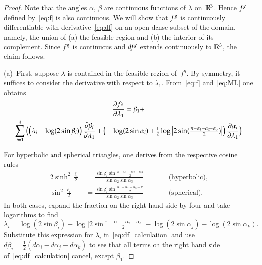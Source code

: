 \documentclass[Thesis]{subfiles}
\begin{document}
\begin{proof}
  Note that the angles $\alpha$, $\beta$ are continuous functions of
  $\lambda$ on~$\mathbb R^{3}$. Hence $f^{g}$ defined by~\eqref{eq:f} is
  also continuous. We will show that $f^{g}$ is continuously
  differentiable with derivative~\eqref{eq:df} on an open dense subset
  of the domain, namely, the union of (a) the feasible region and (b)
  the interior of its complement. Since $f^{g}$ is continuous and
  $\it df^{g}$ extends continuously to $\mathbb R^{3}$, the claim follows.

  (a)\, First, suppose $\lambda$ is contained in the feasible region
  of~$f^{g}$. By symmetry, it suffices to consider the derivative with
  respect to $\lambda_{1}$. From~\eqref{eq:f} and~\eqref{eq:ML} one
  obtains
  \begin{multline}
    \frac{\partial f^{g}}{\partial\lambda_{1}}
    =
    \beta_{1} + 
    \\\sum_{i=1}^{3}
    \Big(
    \big(\lambda_{i} - \log(2\sin\beta_{i})\big)\,
    \frac{\partial\beta_{i}}{\partial\lambda_{1}}
    +\big(
    - \log(2\sin\alpha_{i})
    +\tfrac{1}{2}
    \log\big|2\sin(\tfrac{\pi-\alpha_{1}-\alpha_{2}-\alpha_{3}}{2})\big|
    \big)\,
    \frac{\partial\alpha_{i}}{\partial\lambda_{1}}
    \Big)
    \label{eq:df_calculation}
  \end{multline}

  For hyperbolic and spherical triangles, one derives from the
  respective cosine rules
  \begin{alignat*}{2}
    \sinh^{2}\frac{\ell_{i}}{2} &= 
    \frac{
      \sin\beta_{i}
      \sin\frac{\pi-\alpha_{1}-\alpha_{2}-\alpha_{3}}{2}
    }{
      \sin\alpha_{2} \sin\alpha_{3}
    }
    &\qquad&\text{(hyperbolic),}\\
    \sin^{2}\frac{\ell_{i}}{2} &= 
    \frac{
      \sin\beta_{i}
      \sin\frac{\alpha_{1}+\alpha_{2}+\alpha_{3}-\pi}{2}
    }{
      \sin\alpha_{2} \sin\alpha_{3}
    }
    &\qquad&\text{(spherical).}
  \end{alignat*}
  In both cases, expand the fraction on the right hand side by four and
  take logarithms to find
  \begin{equation*}
    \lambda_{i}=\log(2\sin\beta_{i})
    +\log\big|2\sin\tfrac{\pi-\alpha_{1}-\alpha_{2}-\alpha_{3}}{2}\big|
    -\log(2\sin\alpha_{j})-\log(2\sin\alpha_{k}).
  \end{equation*}
  Substitute this expression for $\lambda_{i}$
  in~\eqref{eq:df_calculation} and use
  $d\beta_{i}=\tfrac{1}{2}(d\alpha_{i}-d\alpha_{j}-d\alpha_{k})$ to
  see that all terms on the right hand side
  of~\eqref{eq:df_calculation} cancel, except $\beta_{1}$.


\end{proof}
\end{document}
